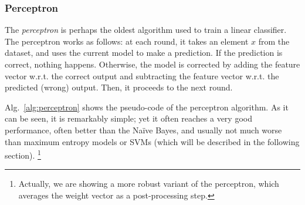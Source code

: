 \subsubsection{\label{s:perceptron} Perceptron}

The \emph{perceptron} \citep{Rosenblatt1958} is perhaps the oldest algorithm used to train a linear classifier. 
The perceptron works as follows: at each round, it takes an element $x$ from the dataset, and uses the current model 
to make a prediction. If the prediction is correct, nothing happens. 
Otherwise, the model is corrected by adding the feature vector w.r.t. the correct output and 
subtracting the  feature vector w.r.t. the predicted (wrong) output. Then, it proceeds to the next round. 


Alg.~\ref{alg:perceptron} shows the pseudo-code of the perceptron algorithm. As it can be seen, it is remarkably simple; yet it often reaches a very good performance, 
often better than the Na\"ive Bayes, and usually not much worse than maximum entropy models or SVMs (which will be 
described in the following section).
\footnote{Actually, we are showing a more robust variant of the perceptron, 
which averages the weight vector as a post-processing step.}  


